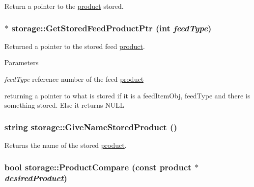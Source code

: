Return a pointer to the \hyperlink{classproduct}{product} stored. \hypertarget{classstorage_a1753e116e718886f484ce173cefa652f}{
\subsubsection[{GetStoredFeedProductPtr}]{ $\ast$ storage::GetStoredFeedProductPtr (int {\em feedType})}}
\label{classstorage_a1753e116e718886f484ce173cefa652f}


Returned a pointer to the stored feed \hyperlink{classproduct}{product}. 
\begin{DoxyParams}{Parameters}
\item[{\em feedType}]reference number of the feed \hyperlink{classproduct}{product}\end{DoxyParams}
returning a pointer to what is stored if it is a feedItemObj, feedType and there is something stored. Else it returns NULL \hypertarget{classstorage_ae6dd348ff4165ddadea893d7f423dd9f}{
\subsubsection[{GiveNameStoredProduct}]{\setlength{\rightskip}{0pt plus 5cm}string storage::GiveNameStoredProduct ()}}
\label{classstorage_ae6dd348ff4165ddadea893d7f423dd9f}


Returns the name of the stored \hyperlink{classproduct}{product}. \hypertarget{classstorage_a505dd0940fa02ebab1ebb375bbd83c04}{
\subsubsection[{ProductCompare}]{\setlength{\rightskip}{0pt plus 5cm}bool storage::ProductCompare (const {\bf product} $\ast$ {\em desiredProduct})}}
\label{classstorage_a505dd0940fa02ebab1ebb375bbd83c04}


